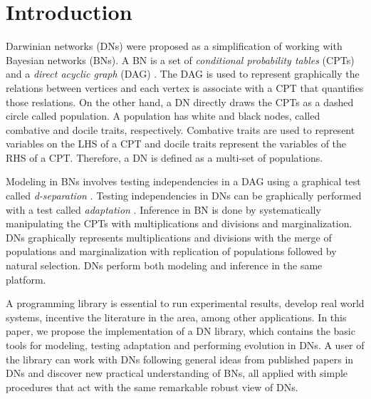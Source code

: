 %
\chapter{Introduction}
\label{sec:intro}

Darwinian networks (DNs) \cite{butzOliveiraSantosCai15} were proposed as a simplification of working with Bayesian networks (BNs).
A BN is a set of \emph{conditional probability tables} (CPTs) and a \emph{direct acyclic graph} (DAG) \cite{pear88}.
The DAG is used to represent graphically the relations between vertices and each vertex is associate with a CPT that quantifies those reslations.
On the other hand, a DN directly draws the CPTs as a dashed circle called population.
A population has white and black nodes, called combative and docile traits, respectively.
Combative traits are used to represent variables on the LHS of a CPT and docile traits represent the variables of the RHS of a CPT.
Therefore, a DN is defined as a multi-set of populations.

Modeling in BNs involves testing independencies in a DAG using a graphical test called \emph{d-separation} \cite{pear88}.
Testing independencies in DNs can be graphically performed with a test called \emph{adaptation} \cite{butzOliveiraSantosCai15}.
Inference in BN is done by systematically manipulating the CPTs with multiplications and divisions and marginalization.
DNs graphically represents multiplications and divisions with the merge of populations and marginalization with replication of populations followed by natural selection.
DNs perform both modeling and inference in the same platform.

A programming library is essential to run experimental results, develop real world systems, incentive the literature in the area, among other applications.
In this paper, we propose the implementation of a DN library, which contains the basic tools for modeling, testing adaptation and performing evolution in DNs.
A user of the library can work with DNs following general ideas from published papers in DNs \cite{butzOliveiraSantosCai15} and discover new practical understanding of BNs, all applied with simple procedures that act with the same remarkable robust view of DNs.

